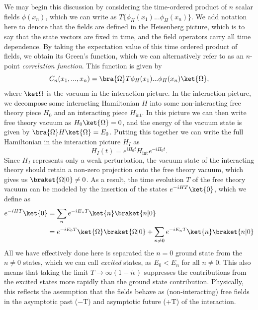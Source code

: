 We may begin this discussion by considering the time-ordered product of $n$ scalar fields $\phi(x_n)$, which we can write as $T\{{\phi_H}(x_1)...\phi_H(x_n)\}$.  We add notation here to denote that the fields are defined in the Heisenberg picture, which is to say that the state vectors are fixed in time, and the field operators carry all time dependence.  By taking the expectation value of this time ordered product of fields, we obtain its Green's function, which we can alternatively refer to as an $n$-point \textit{correlation function}.  This function is given by
\begin{equation}\label{eq:C_n-corrfunction}
    C_n(x_1,...,x_n) = \bra{\Omega}T{\phi_H}(x_1)...\phi_H(x_n)\ket{\Omega},
\end{equation}
where $\ket\Omega$ is the vacuum in the interaction picture.  In the interaction picture, we decompose some interacting Hamiltonian $H$ into some non-interacting free theory piece $H_0$ and an interacting piece $H_\mathrm{int}$.  In this picture we can then write free theory vacuum as $H_0\ket{\Omega}=0$, and the energy of the vacuum state is given by $\bra{\Omega}H\ket{\Omega} = E_0$.
Putting this together we can write the full Hamiltonian in the interaction picture $H_I$ as 
\begin{equation}
H_I(t) = e^{iH_0t}H_\mathrm{int}e^{-iH_0t}.
\end{equation}
Since $H_I$ represents only a weak perturbation, the vacuum state of the interacting theory should retain a non-zero projection onto the free theory vacuum, which gives us $\braket{\Omega|0}\neq 0$. As a result, the time evolution $T$ of the free theory vacuum can be modeled by the insertion of the states $e^{-iHT}\ket{0}$, which we define as
\begin{equation}\label{eq:time-evolution}
\begin{split}
    e^{-iHT}\ket{0} &= \sum_n e^{-iE_nT}\ket{n} \braket{n|0} \\
    &= e^{-iE_0T}\ket{\Omega}\braket{\Omega|0} + \sum_{n\neq0}e^{-iE_nT}\ket{n}\braket{n|0}
\end{split}
\end{equation}
All we have effectively done here is separated the $n=0$ ground state from the $n\neq0$ states, which we can call \textit{excited} states, as $E_0 <E_n$ for all $n\neq0$.  This also means that taking the limit $T\rightarrow\infty(1-i\epsilon)$ suppresses the contributions from the excited states more rapidly than the ground state contribution. Physically, this reflects the assumption that the fields behave as (non-interacting) free fields in the asymptotic past (−T) and asymptotic future (+T) of the interaction.  

